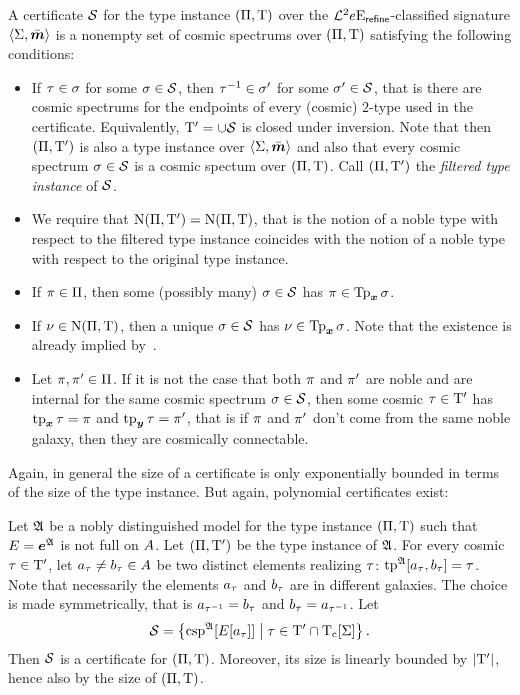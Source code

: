 \begin{definition}
A certificate $\mathcal{S}$ for the type instance $(\Pi,\mathrm{T})$ over the
$\mathcal{L}^{2}{e}\mathrm{E}_{\mathsf{refine}}$-classified signature $\left\langle \mathrm{\Sigma},\bar{\bm{m}} \right\rangle$ is a nonempty
set of cosmic spectrums over $(\Pi,\mathrm{T})$ satisfying the following
conditions:
\begin{itemize}
  \item[\condcertmi]\label{cond:certmi}
  If $\tau \in \sigma$ for some $\sigma \in \mathcal{S}$, then
  $\tau^{-1} \in {\sigma'}$ for some ${\sigma'} \in \mathcal{S}$, 
  that is there are cosmic spectrums for the endpoints of every (cosmic)
  $2$-type used in the certificate.
  Equivalently, ${\mathrm{T}'} = \cup\mathcal{S}$ is closed under inversion.
  Note that then $(\Pi,{\mathrm{T}'})$ is also a type instance over
  $\left\langle \mathrm{\Sigma},\bar{\bm{m}} \right\rangle$ and also that every cosmic spectrum $\sigma \in \mathcal{S}$ is a
  cosmic spectum over $(\Pi,\mathrm{T})$. Call $(\Pi,{\mathrm{T}'})$ the
  \emph{filtered type instance} of $\mathcal{S}$.
  \item[\condcertmN]\label{cond:certmN}
  We require that $\mathrm{\mathrm{N}}(\Pi,{\mathrm{T}'}) = \mathrm{\mathrm{N}}(\Pi,\mathrm{T})$, that is the notion of a
  noble type with respect to the filtered type instance coincides with the
  notion of a noble type with respect to the original type instance.
  \item[\condcertmp]\label{cond:certmp}
  If $\pi \in \Pi$, then some (possibly many) $\sigma \in \mathcal{S}$ has $\pi
  \in \operatorname{Tp}_{\bm{x}}\sigma$.
  \item[\condcertmn]\label{cond:certmn}
  If $\nu \in \mathrm{\mathrm{N}}(\Pi,\mathrm{T})$, then a unique $\sigma \in \mathcal{S}$ has $\nu
  \in \operatorname{Tp}_{\bm{x}}\sigma$. Note that the existence is already implied by~.
  \item[\condcertmc]\label{cond:certmc}
  Let $\pi, {\pi'} \in \Pi$. If it is not the case that both $\pi$ and
  ${\pi'}$ are noble and are internal for the same cosmic spectrum $\sigma \in
  \mathcal{S}$, then some cosmic $\tau \in {\mathrm{T}'}$ has $\operatorname{tp}_{\bm{x}}\tau = \pi$ and
  $\operatorname{tp}_{\bm{y}}\tau = {\pi'}$, that is if $\pi$ and ${\pi'}$ don't come from the
  same noble galaxy, then they are cosmically connectable.
\end{itemize}
\end{definition}
Again, in general the size of a certificate is only exponentially bounded in
terms of the size of the type instance. But again, polynomial certificates
exist:
\begin{lemma}\label{lem:cert-extr-many}
Let $\mathfrak{A}$ be a nobly distinguished model for the type instance
$(\Pi,\mathrm{T})$ such that $E = \bm{e}^{\mathfrak{A}}$ is not full on $A$.
Let $(\Pi,{\mathrm{T}'})$ be the type instance of $\mathfrak{A}$. For every cosmic $\tau
\in {\mathrm{T}'}$, let $a_{\tau} \neq b_{\tau} \in A$ be two distinct elements
realizing $\tau$: $\operatorname{tp}^{\mathfrak{A}}[a_{\tau},b_{\tau}] = \tau$. Note that
necessarily the elements $a_{\tau}$ and $b_{\tau}$ are in different galaxies.
The choice is made symmetrically, that is $a_{\tau^{-1}} = b_{\tau}$ and
$b_{\tau} = a_{\tau^{-1}}$. Let
\[
  \mathcal{S} = \left\{\operatorname{csp}^{\mathfrak{A}}[E[a_{\tau}]]\mathrel{}\middle|\mathrel{}\tau \in {\mathrm{T}'} \cap
  \mathrm{T}_{\mathrm{c}}[\mathrm{\Sigma}]\right\}.
\]
Then $\mathcal{S}$ is a certificate for $(\Pi,\mathrm{T})$.
Moreover, its size is linearly bounded by $\left|{\mathrm{T}'}\right|$, hence also by the size
of $(\Pi,\mathrm{T})$.
\end{lemma}
